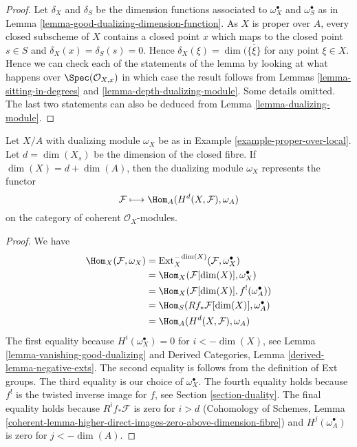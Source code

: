\begin{proof}
Let $\delta_X$ and $\delta_S$ be the dimension functions associated to
$\omega_X^\bullet$ and $\omega_S^\bullet$ as in
Lemma \ref{lemma-good-dualizing-dimension-function}.
As $X$ is proper over $A$, every closed subscheme of $X$ contains
a closed point $x$ which maps to the closed point $s \in S$
and $\delta_X(x) = \delta_S(s) = 0$. Hence
$\delta_X(\xi) = \dim(\overline{\{\xi\}}$ for any point
$\xi \in X$. Hence we can check each of
the statements of the lemma by looking at what happens over
$\Spec(\mathcal{O}_{X, x})$ in which case the result follows
from Lemmas \ref{lemma-sitting-in-degrees} and
\ref{lemma-depth-dualizing-module}.
Some details omitted.
The last two statements can also be deduced from
Lemma \ref{lemma-dualizing-module}.
\end{proof}

\begin{lemma}
\label{lemma-dualizing-module-proper-over-A}
Let $X/A$ with dualizing module $\omega_X$ be as in
Example \ref{example-proper-over-local}.
Let $d = \dim(X_s)$ be the dimension
of the closed fibre. If $\dim(X) = d + \dim(A)$, then
the dualizing module $\omega_X$ represents the functor
$$
\mathcal{F} \longmapsto \Hom_A(H^d(X, \mathcal{F}), \omega_A)
$$
on the category of coherent $\mathcal{O}_X$-modules.
\end{lemma}

\begin{proof}
We have
\begin{align*}
\Hom_X(\mathcal{F}, \omega_X)
& =
\text{Ext}^{-\dim(X)}_X(\mathcal{F}, \omega_X^\bullet) \\
& =
\Hom_X(\mathcal{F}[\dim(X)], \omega_X^\bullet) \\
& =
\Hom_X(\mathcal{F}[\dim(X)], f^!(\omega_A^\bullet)) \\
& =
\Hom_S(Rf_*\mathcal{F}[\dim(X)], \omega_A^\bullet) \\
& =
\Hom_A(H^d(X, \mathcal{F}), \omega_A)
\end{align*}
The first equality because $H^i(\omega_X^\bullet) = 0$ for
$i < -\dim(X)$, see Lemma \ref{lemma-vanishing-good-dualizing} and
Derived Categories, Lemma \ref{derived-lemma-negative-exts}.
The second equality is follows from the definition of Ext groups.
The third equality is our choice of $\omega_X^\bullet$.
The fourth equality holds because $f^!$ is the twisted inverse
image for $f$, see Section \ref{section-duality}.
The final equality holds because $R^if_*\mathcal{F}$ is zero
for $i > d$ (Cohomology of Schemes, Lemma
\ref{coherent-lemma-higher-direct-images-zero-above-dimension-fibre})
and $H^j(\omega_A^\bullet)$ is zero for $j < -\dim(A)$.
\end{proof}








